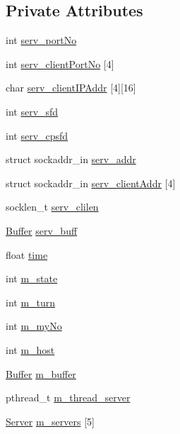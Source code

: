 \subsection*{Private Attributes}
\begin{DoxyCompactItemize}
\item 
int \hyperlink{class_game_afeb6f705821e63812c7479d05c0c8447}{serv\+\_\+port\+No}
\item 
int \hyperlink{class_game_a90aab94315524e741e90fb8e29cbe8dd}{serv\+\_\+client\+Port\+No} \mbox{[}4\mbox{]}
\item 
char \hyperlink{class_game_a4f7f8e29dc9f799e221a38493c7d43ca}{serv\+\_\+client\+I\+P\+Addr} \mbox{[}4\mbox{]}\mbox{[}16\mbox{]}
\item 
int \hyperlink{class_game_ac698cf1904287abc3021f0b6fa7411a4}{serv\+\_\+sfd}
\item 
int \hyperlink{class_game_aa1c8c267903168ca92facc373399531b}{serv\+\_\+cpsfd}
\item 
struct sockaddr\+\_\+in \hyperlink{class_game_adbda5d55bf70435c7f4bcbe27af49dcc}{serv\+\_\+addr}
\item 
struct sockaddr\+\_\+in \hyperlink{class_game_aad42b135b7c7c3fcb96a5faa6ecd086a}{serv\+\_\+client\+Addr} \mbox{[}4\mbox{]}
\item 
socklen\+\_\+t \hyperlink{class_game_a4a261876196ef61c4808c3e34a06e0b1}{serv\+\_\+clilen}
\item 
\hyperlink{netlib_8hpp_a2e50028ebd48ce86d5b1fc983d6ef155}{Buffer} \hyperlink{class_game_a38fa2f0f4350dfa47bd85fd13e3e558c}{serv\+\_\+buff}
\item 
float \hyperlink{class_game_ace6d6f7c808735dabb0e4d46e9f95495}{time}
\item 
int \hyperlink{class_game_aa6fd7fa82d311756848b0e6fe3e636ee}{m\+\_\+state}
\item 
int \hyperlink{class_game_a9442e9eb5eacee1fd1bac6ab9e0737dc}{m\+\_\+turn}
\item 
int \hyperlink{class_game_ad1bcd562d4abde5c4c4cba9d3ce65113}{m\+\_\+my\+No}
\item 
int \hyperlink{class_game_ae668e9c38c6d79fd8115ba23983ffdd6}{m\+\_\+host}
\item 
\hyperlink{netlib_8hpp_a2e50028ebd48ce86d5b1fc983d6ef155}{Buffer} \hyperlink{class_game_a82c4007d09ac390cb7f783868f7b6279}{m\+\_\+buffer}
\item 
pthread\+\_\+t \hyperlink{class_game_a0d5f7576bfcb537e6b13faa3712e6c70}{m\+\_\+thread\+\_\+server}
\item 
\hyperlink{netlib_8hpp_a95e7ffbda40674e59bb208b9c6c9a22a}{Server} \hyperlink{class_game_ae5ed3302bc0b3e8b25aca8437cf4a9fa}{m\+\_\+servers} \mbox{[}5\mbox{]}

\end{DoxyCompactItemize}
